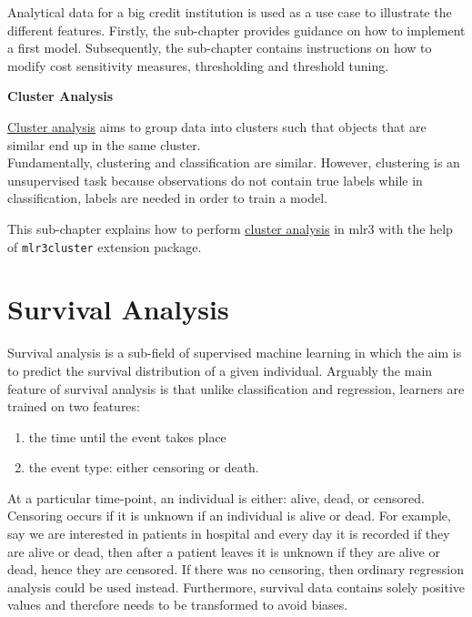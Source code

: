 \documentclass[
]{scrbook}
\providecommand{\tightlist}{%
  \setlength{\itemsep}{0pt}\setlength{\parskip}{0pt}}
\begin{document}
Analytical data for a big credit institution is used as a use case to illustrate the different features.
Firstly, the sub-chapter provides guidance on how to implement a first model.
Subsequently, the sub-chapter contains instructions on how to modify cost sensitivity measures, thresholding and threshold tuning.

\textbf{Cluster Analysis}

\protect\hyperlink{cluster}{Cluster analysis} aims to group data into clusters such that objects that are similar end up in the same cluster.\\
Fundamentally, clustering and classification are similar.
However, clustering is an unsupervised task because observations do not contain true labels while in classification, labels are needed in order to train a model.

This sub-chapter explains how to perform \protect\hyperlink{cluster}{cluster analysis} in mlr3 with the help of \texttt{mlr3cluster} extension package.

\hypertarget{survival}{%
\section{Survival Analysis}\label{survival}}

Survival analysis is a sub-field of supervised machine learning in which the aim is to predict the survival distribution of a given individual.
Arguably the main feature of survival analysis is that unlike classification and regression, learners are trained on two features:

\begin{enumerate}
\def\labelenumi{\arabic{enumi}.}
\tightlist
\item
  the time until the event takes place
\item
  the event type: either censoring or death.
\end{enumerate}

At a particular time-point, an individual is either: alive, dead, or censored.
Censoring occurs if it is unknown if an individual is alive or dead.
For example, say we are interested in patients in hospital and every day it is recorded if they are alive or dead, then after a patient leaves it is unknown if they are alive or dead, hence they are censored.
If there was no censoring, then ordinary regression analysis could be used instead.
Furthermore, survival data contains solely positive values and therefore needs to be transformed to avoid biases.
\end{document}
